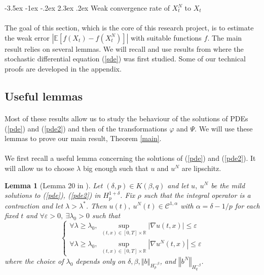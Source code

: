 \documentclass[11pt]{article}
\makeatletter
\renewcommand\section{\@startsection {section}{1}{\z@}%
    {-3.5ex \@plus -1ex \@minus -.2ex}%
    {2.3ex \@plus.2ex}%
    {\centering\large\scshape\bfseries}}
\newtheorem{lem}[theo]{Lemma}
\newcommand{\norme}[1]{\left\Vert #1\right\Vert}
\newcommand{\R}{\mathbb{R}}
\newcommand{\E}{\mathbb{E}}
\makeatother
\begin{document}
\section{Weak convergence rate of $X^{N}_t$ to $X_t$}
\paragraph{}
The goal of this section, which is the core of this research project, is to estimate the weak error $\left|\E\left[f\left(X_t\right)-f\left(X_t^N\right)\right]\right|$ with suitable functions $f$. The main result relies on several lemmas. We will recall and use results from \cite{Fla-Iss-Rus-2017} where the stochastic differential equation (\ref{sde}) was first studied. Some of our technical proofs are developed in the appendix.

\subsection{Useful lemmas}

\paragraph{}      
Most of these results allow us to study the behaviour of the solutions of PDEs (\ref{pde}) and (\ref{pde2}) and then of the transformations $\varphi$ and $\Psi$. We will use these lemmas to prove our main result, Theorem \ref{main}. 

\paragraph{}
We first recall a useful lemma concerning the solutions of (\ref{pde}) and (\ref{pde2}). It will allow us to choose $\lambda$ big enough such that $u$ and $u^N$ are lipschitz.

\begin{lem}[Lemma 20 in \cite{Fla-Iss-Rus-2017}]\label{lem}
    Let $(\delta,p)\in K(\beta,q)$ and let $u,\ u^N$ be the mild solutions to (\ref{pde}), (\ref{pde2}) in $H_p^{1+\delta}$. Fix $\rho$ such that the integral operator is a contraction and let $\lambda>\lambda^*$. Then $u(t),\ u^N(t)\in\mathcal{C}^{1,\alpha}$ with $\alpha=\delta-1/p$ for each fixed $t$ and $\forall\varepsilon>0,\ \exists\lambda_0>0$ such that
    \begin{equation}
    \begin{cases}\forall\lambda\geq\lambda_0,\
    \underset{(t,x)\in[0,T]\times\R}{\sup} |\nabla u(t,x)| \leq\varepsilon  \\ \forall\lambda\geq\lambda_0,\
    \underset{(t,x)\in[0,T]\times\R}{\sup} |\nabla u^N(t,x)| \leq\varepsilon
    \end{cases}
    \end{equation}
    where the choice of $\lambda_0$ depends only on $\delta,\beta,\norme{b}_{H_p^{-\beta}}$, and $\norme{b^N}_{H_q^{-\beta}}$.
\end{lem}
\end{document}
